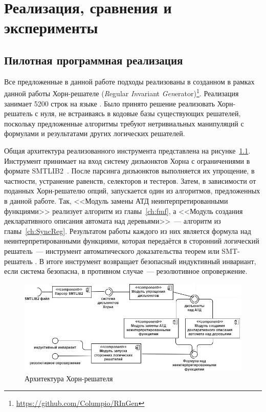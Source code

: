 \chapter{Реализация, сравнения и эксперименты}\label{ch:evaluation}

\section{Пилотная программная реализация}
Все предложенные в данной работе подходы реализованы в созданном в рамках данной работы Хорн-решателе \theringen{} (\emph{R}egular \emph{In}variant \emph{Gen}erator)\footnote{\url{https://github.com/Columpio/RInGen}}.
Реализация занимает 5200 строк на языке \fsharp{}.
Было принято решение реализовать Хорн-решатель с нуля, не встраиваясь в кодовые базы существующих решателей, поскольку предложенные алгоритмы требуют нетривиальных манипуляций с формулами и результатами других логических решателей.


Общая архитектура реализованного инструмента представлена на рисунке~\ref{fig:ringen-arch}.
Инструмент \theringen{} принимает на вход систему дизъюнктов Хорна с ограничениями в формате SMTLIB2~\cite{BarFT-RR-17}.
После парсинга дизъюнктов выполняется их упрощение, в частности, устранение равенств, селекторов и тестеров. Затем, в зависимости от поданных Хорн-решателю опций, запускается один из алгоритмов, предложенных в данной работе. Так, <<Модуль замены АТД неинтерпретированными функциями>> реализует алгоритм из главы~\ref{ch:fmf}, а <<Модуль создания декларативного описания автомата над деревьями>>~--- алгоритм из главы~\ref{ch:SyncReg}. Результатом работы каждого из них является формула над неинтерпретированными функциями, которая передаётся в сторонний логический решатель~--- инструмент автоматического доказательства теорем \vampire{} или SMT-решатель \cvc{}.
В итоге инструмент возвращает безопасный индуктивный инвариант, если система безопасна, в противном случае~--- резолютивное опровержение.
\begin{figure}[h]
    \centering
    \includegraphics[width=\textwidth]{Dissertation/images/arch.png}
    \caption{Архитектура Хорн-решателя \theringen{}}
    \label{fig:ringen-arch}
\end{figure}


